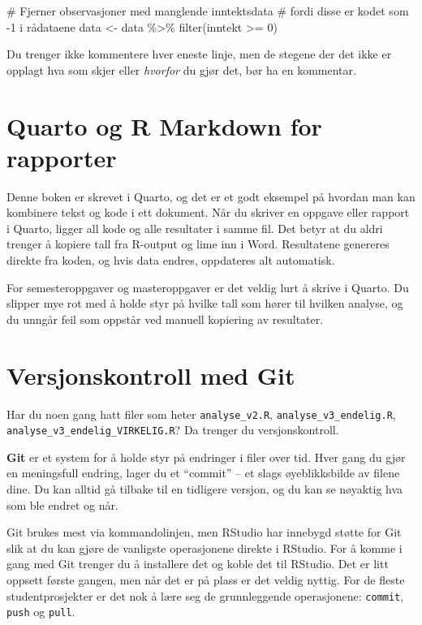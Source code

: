 \documentclass[
  norsk,
  letterpaper,
  DIV=11,
  numbers=noendperiod]{scrreprt}
\newenvironment{Shaded}{\begin{snugshade}}{\end{snugshade}}
\newcommand{\CommentTok}[1]{\textcolor[rgb]{0.37,0.37,0.37}{#1}}
\newcommand{\DecValTok}[1]{\textcolor[rgb]{0.68,0.00,0.00}{#1}}
\newcommand{\FunctionTok}[1]{\textcolor[rgb]{0.28,0.35,0.67}{#1}}
\newcommand{\NormalTok}[1]{\textcolor[rgb]{0.00,0.23,0.31}{#1}}
\newcommand{\OtherTok}[1]{\textcolor[rgb]{0.00,0.23,0.31}{#1}}
\newcommand{\SpecialCharTok}[1]{\textcolor[rgb]{0.37,0.37,0.37}{#1}}
\theoremstyle{definition}
\theoremstyle{remark}
\begin{document}
\begin{Shaded}
\begin{Highlighting}[]
\CommentTok{\# Fjerner observasjoner med manglende inntektsdata}
\CommentTok{\# fordi disse er kodet som {-}1 i rådataene}
\NormalTok{data }\OtherTok{\textless{}{-}}\NormalTok{ data }\SpecialCharTok{\%\textgreater{}\%}
  \FunctionTok{filter}\NormalTok{(inntekt }\SpecialCharTok{\textgreater{}=} \DecValTok{0}\NormalTok{)}
\end{Highlighting}
\end{Shaded}

Du trenger ikke kommentere hver eneste linje, men de stegene der det
ikke er opplagt hva som skjer eller \emph{hvorfor} du gjør det, bør ha
en kommentar.

\section{Quarto og R Markdown for
rapporter}\label{quarto-og-r-markdown-for-rapporter}

Denne boken er skrevet i Quarto, og det er et godt eksempel på hvordan
man kan kombinere tekst og kode i ett dokument. Når du skriver en
oppgave eller rapport i Quarto, ligger all kode og alle resultater i
samme fil. Det betyr at du aldri trenger å kopiere tall fra R-output og
lime inn i Word. Resultatene genereres direkte fra koden, og hvis data
endres, oppdateres alt automatisk.

For semesteroppgaver og masteroppgaver er det veldig lurt å skrive i
Quarto. Du slipper mye rot med å holde styr på hvilke tall som hører til
hvilken analyse, og du unngår feil som oppstår ved manuell kopiering av
resultater.

\section{Versjonskontroll med Git}\label{versjonskontroll-med-git}

Har du noen gang hatt filer som heter \texttt{analyse\_v2.R},
\texttt{analyse\_v3\_endelig.R},
\texttt{analyse\_v3\_endelig\_VIRKELIG.R}? Da trenger du
versjonskontroll.

\textbf{Git} er et system for å holde styr på endringer i filer over
tid. Hver gang du gjør en meningsfull endring, lager du et ``commit'' --
et slags øyeblikksbilde av filene dine. Du kan alltid gå tilbake til en
tidligere versjon, og du kan se nøyaktig hva som ble endret og når.

Git brukes mest via kommandolinjen, men RStudio har innebygd støtte for
Git slik at du kan gjøre de vanligste operasjonene direkte i RStudio.
For å komme i gang med Git trenger du å installere det og koble det til
RStudio. Det er litt oppsett første gangen, men når det er på plass er
det veldig nyttig. For de fleste studentprosjekter er det nok å lære seg
de grunnleggende operasjonene: \texttt{commit}, \texttt{push} og
\texttt{pull}.
\end{document}
